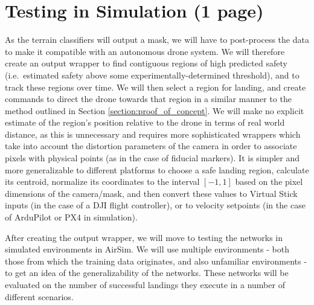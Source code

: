 \section{Testing in Simulation (1 page)}

As the terrain classifiers will output a mask, we will have to post-process the data
to make it compatible with an autonomous drone system.
We will therefore create an output wrapper
to find contiguous regions of high predicted safety (i.e.~estimated safety above
some experimentally-determined threshold),
and to track these regions over time.
We will then select a region for landing, and create commands to direct the drone
towards that region in a similar manner to the method outlined in Section \ref{section:proof_of_concept}.
We will make no explicit estimate of the region's position relative to the drone in terms
of real world distance,
as this is unnecessary and requires more sophisticated wrappers which take into account the distortion
parameters of the camera in order to associate pixels with physical points (as in the case of fiducial markers).
It is simpler and more generalizable to different platforms to choose a safe landing region,
calculate its centroid, normalize its coordinates to the interval $[-1,1]$
based on the pixel dimensions of the camera/mask,
and then convert these values to Virtual Stick inputs (in the case of a DJI flight controller),
or to velocity setpoints (in the case of ArduPilot or PX4 in simulation).

After creating the output wrapper, we will move to testing the networks in simulated environments
in AirSim.
We will use multiple environments - both those from which the training data originates,
and also unfamiliar environments - to get an idea of the generalizability of the networks.
These networks will be evaluated on the number of successful landings they execute in a number
of different scenarios.
